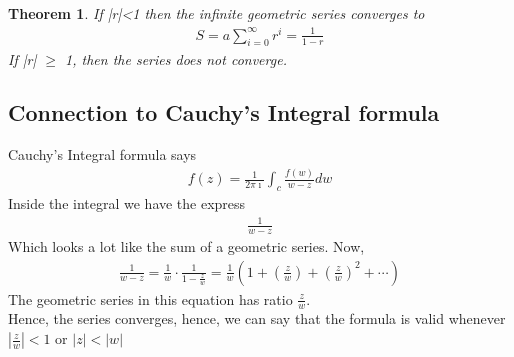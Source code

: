 \documentclass[11pt]{report}
\newcommand{\dsp}{\displaystyle}
\newcommand{\NI}{\noindent}
\newcommand{\imaginary}{\imath}
\newtheorem{theorem}{Theorem}[chapter]
\begin{document}
	\begin{theorem}
		If |r|<1 then the infinite geometric series converges to 
		\begin{eqnarray*}
			S = a\sum_{i=0}^{\infty}r^i = \frac{1}{1-r}
		\end{eqnarray*}
		If |r| $\geq$ 1, then the series does not converge.
	\end{theorem}
	
	\subsection{Connection to Cauchy's Integral formula}
	Cauchy's Integral formula says
	\begin{eqnarray*}
		f(z) = \frac{1}{2\pi\imaginary}\int_c \frac{f(w)}{w-z}dw
	\end{eqnarray*}
	Inside the integral we have the express
	\begin{eqnarray*}
		\frac{1}{w-z}
	\end{eqnarray*}
	Which looks a lot like the sum of a geometric series. Now,
	\begin{eqnarray*}
		\frac{1}{w-z} = \frac{1}{w}\cdot \frac{1}{1-\frac{z}{w}} = \frac{1}{w}\left( 1 + \left(\frac{z}{w}\right)+ \left(\frac{z}{w}\right)^2 + \cdots \right)
	\end{eqnarray*}
	The geometric series in this equation has ratio $\dsp\frac{z}{w}$.\\
	
	\NI Hence, the series converges, hence, we can say that the formula is valid whenever $\dsp\left|\frac{z}{w}\right| < 1$ or $|z|< |w|$



	
\end{document}
